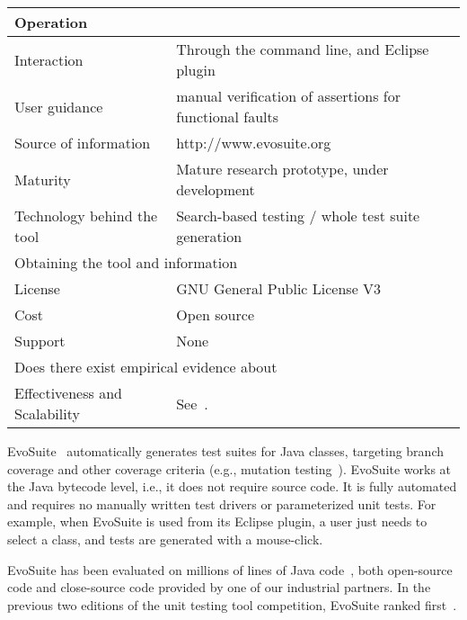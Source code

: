 \documentclass[10pt,conference,compsocconf]{IEEEtran}
\newcommand{\EVOSUITE}{{\sc EvoSuite}\xspace}
\begin{document}
\begin{table}[!h]
\begin{tabular}{|l|p{5cm}|}
  \hline
  \multicolumn{2}{|l|}{Operation} \\
  \hline
  Interaction &  Through the command line, and Eclipse plugin\\
  User guidance &  manual verification of assertions for functional faults\\
  Source of information &  http://www.evosuite.org \\
  Maturity&  Mature research prototype, under development\\
  Technology behind the tool & Search-based testing / whole test suite generation\\
\hline
  \multicolumn{2}{|l|}{Obtaining the tool and information} \\
  \hline
License & GNU General Public License V3\\
Cost & Open source\\
Support & None \\
\hline
\hline
  \multicolumn{2}{|l|}{Does there exist empirical evidence about} \\
  \hline
  Effectiveness and Scalability & See~\cite{GoA_TSE12,fraser2014large}. \\
\hline
\end{tabular}\vspace{-1em}
\end{table}


\EVOSUITE~\cite{FrA11c,GoA_TSE12} automatically generates test suites
for Java classes, targeting branch coverage and other coverage
criteria (e.g., mutation testing~\cite{emse14_mutation}). \EVOSUITE
works at the Java bytecode level, i.e., it does not require source
code. It is fully automated and requires no manually written test
drivers or parameterized unit tests.  For example, when \EVOSUITE is
used from its Eclipse plugin, a user
just needs to select a class, and tests are generated with a mouse-click.

\EVOSUITE has been evaluated on millions of lines of Java
code~\cite{fraser2014large}, both open-source code and close-source
code provided by one of our industrial partners.  In the previous two
editions of the unit testing tool competition, \EVOSUITE ranked
first~\cite{evosuiteAtSbst2013,evosuiteAtFittest2013}.
\end{document}
